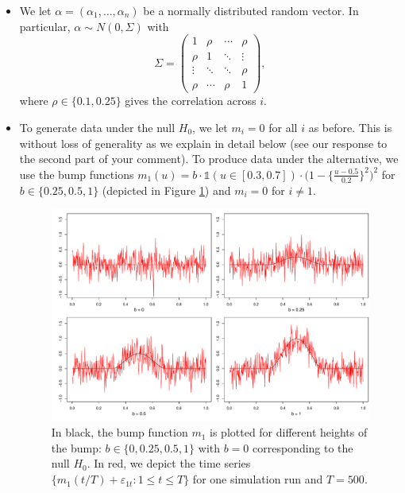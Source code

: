 \documentclass[a4paper,12pt]{article}
\begin{document}
\begin{enumerate}[label=\arabic*.,leftmargin=0.6cm]
\begin{enumerate}[label=(\roman*),leftmargin=0.75cm,topsep=0pt]
\begin{itemize}[leftmargin=0.45cm,itemsep=0pt,topsep=0pt]
\item We let $\alpha = (\alpha_1,\ldots,\alpha_n)$ be a normally distributed random vector. In particular, $\alpha \sim N(0,\Sigma)$ with
\[ \Sigma =
\begin{pmatrix}
1      & \rho   & \cdots & \rho   \\
\rho   & 1      & \ddots & \vdots \\
\vdots & \ddots & \ddots & \rho   \\
\rho   & \cdots & \rho   & 1
\end{pmatrix},
\]
where $\rho \in \{0.1, 0.25\}$ gives the correlation across $i$.

\item To generate data under the null $H_0$, we let $m_i = 0$ for all $i$ as before. This is without loss of generality as we explain in detail below (see our response to the second part of your comment). To produce data under the alternative, we use the bump functions $m_1(u) = b \cdot \mathbb{1}(u \in [0.3, 0.7]) \cdot \big(1 - \big\{\frac{u - 0.5}{0.2}\big\}^2\big)^2$ for $b \in \{ 0.25, 0.5, 1 \}$ (depicted in Figure \ref{fig:bump_function}) and $m_i = 0$ for $i \neq 1$.

\begin{figure}[t!]
\includegraphics[width=\textwidth]{output/bump_function.pdf}
\caption{In black, the bump function $m_1$ is plotted for different heights of the bump: $b \in \{0, 0.25, 0.5, 1\}$ with $b=0$ corresponding to the null $H_0$. In red, we depict the time series $\{m_1(t/T) + \varepsilon_{1t}: 1 \le t \le T\}$ for one simulation run and $T=500$.}\label{fig:bump_function}

\end{figure}


\end{itemize}
\end{enumerate}
\end{enumerate}
\end{document}
